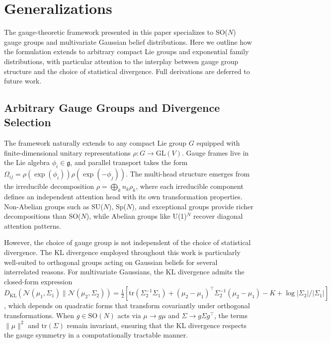 \documentclass[twoside,11pt]{article}
\begin{document}
\section{Generalizations}
\label{app:generalizations}

The gauge-theoretic framework presented in this paper specializes to SO($N$) gauge groups and multivariate Gaussian belief distributions. Here we outline how the formulation extends to arbitrary compact Lie groups and exponential family distributions, with particular attention to the interplay between gauge group structure and the choice of statistical divergence. Full derivations are deferred to future work.

\subsection{Arbitrary Gauge Groups and Divergence Selection}

The framework naturally extends to any compact Lie group $G$ equipped with finite-dimensional unitary representations $\rho: G \to \mathrm{GL}(V)$. Gauge frames live in the Lie algebra $\phi_i \in \mathfrak{g}$, and parallel transport takes the form $\Omega_{ij} = \rho(\exp(\phi_i))\rho(\exp(-\phi_j))$. The multi-head structure emerges from the irreducible decomposition $\rho = \bigoplus_k n_k \rho_k$, where each irreducible component defines an independent attention head with its own transformation properties. Non-Abelian groups such as SU($N$), Sp($N$), and exceptional groups provide richer decompositions than SO($N$), while Abelian groups like U(1)$^N$ recover diagonal attention patterns.

However, the choice of gauge group is not independent of the choice of statistical divergence. The KL divergence employed throughout this work is particularly well-suited to orthogonal groups acting on Gaussian beliefs for several interrelated reasons. For multivariate Gaussians, the KL divergence admits the closed-form expression $D_{\mathrm{KL}}(\mathcal{N}(\mu_1, \Sigma_1) \| \mathcal{N}(\mu_2, \Sigma_2)) = \frac{1}{2}[\mathrm{tr}(\Sigma_2^{-1}\Sigma_1) + (\mu_2 - \mu_1)^\top \Sigma_2^{-1}(\mu_2 - \mu_1) - K + \log|\Sigma_2|/|\Sigma_1|]$, which depends on quadratic forms that transform covariantly under orthogonal transformations. When $g \in \mathrm{SO}(N)$ acts via $\mu \to g\mu$ and $\Sigma \to g\Sigma g^\top$, the terms $\|\mu\|^2$ and $\mathrm{tr}(\Sigma)$ remain invariant, ensuring that the KL divergence respects the gauge symmetry in a computationally tractable manner.
\end{document}
